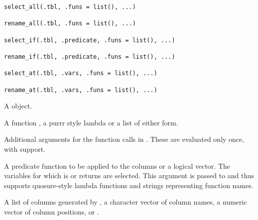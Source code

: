 \documentclass[a4paper]{book}
\begin{document}
%
\begin{Usage}
\begin{verbatim}
select_all(.tbl, .funs = list(), ...)

rename_all(.tbl, .funs = list(), ...)

select_if(.tbl, .predicate, .funs = list(), ...)

rename_if(.tbl, .predicate, .funs = list(), ...)

select_at(.tbl, .vars, .funs = list(), ...)

rename_at(.tbl, .vars, .funs = list(), ...)
\end{verbatim}
\end{Usage}
%
\begin{Arguments}
\begin{ldescription}
\item[\code{.tbl}] A  object.

\item[\code{.funs}] A function , a purrr style lambda  or a list of either form.

\item[\code{...}] Additional arguments for the function calls in
. These are evaluated only once, with  support.

\item[\code{.predicate}] A predicate function to be applied to the columns
or a logical vector. The variables for which  is or
returns  are selected. This argument is passed to
 and thus supports quosure-style lambda
functions and strings representing function names.

\item[\code{.vars}] A list of columns generated by ,
a character vector of column names, a numeric vector of column
positions, or .
\end{ldescription}
\end{Arguments}
%
\end{document}
